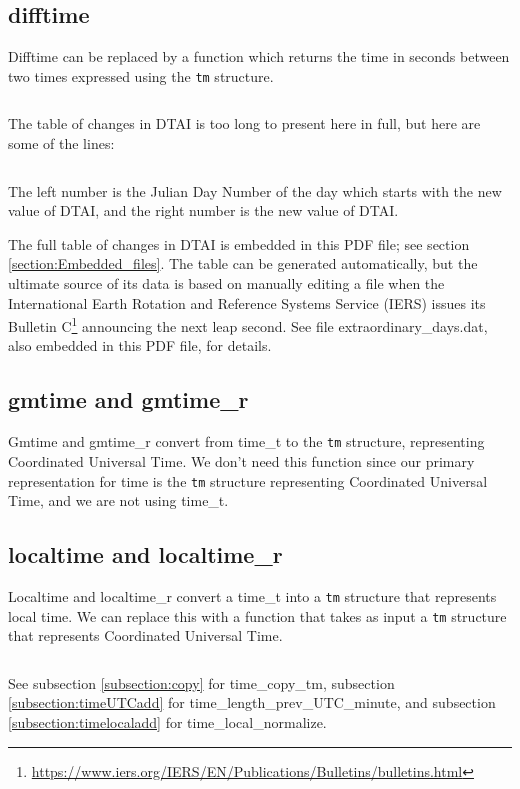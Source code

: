 \documentclass[letterpaper,twoside]{article}
\begin{document}
\subsection{difftime}
\label{subsection:difftime}
Difftime can be replaced by a function which returns the time in seconds
between two times expressed using the \verb|tm| structure.
\inputminted[firstline=37]{c}{time_diff.c}
The table of changes in DTAI is too long to present here in full,
but here are some of the lines:
\inputminted[firstline=46880,lastline=46906]{c}{dtai_table.tab}
The left number is the Julian Day Number of the day which starts with
the new value of DTAI, and the right number is the new value of DTAI.

The full table of changes in DTAI is embedded in this PDF file;
see section \ref{section:Embedded_files}.
The table can be generated automatically\citep{JBS_001}, but the ultimate
source of its data is based on manually editing a file when the
International Earth Rotation and Reference Systems Service (IERS)
issues its Bulletin C\footnote{\url{https://www.iers.org/IERS/EN/Publications/Bulletins/bulletins.html}} announcing the next leap second.  See file
{\ttfamily extraordinary\_days.dat}, also embedded in this PDF file,
for details.

\subsection{gmtime and gmtime\_r}
Gmtime and gmtime\_r convert from {\ttfamily time\_t} to
the \verb|tm| structure,
representing Coordinated Universal Time.  We don't
need this function since our primary representation for time is the
\verb|tm| structure representing Coordinated Universal Time,
and we are not using {\ttfamily time\_t}.

\subsection{localtime and localtime\_r}
\label{subsection:localtime}
Localtime and localtime\_r convert a {\ttfamily time\_t} into
a \verb|tm| structure that
represents local time.  We can replace this with a function that takes
as input a \verb|tm| structure that represents Coordinated Universal Time.
\inputminted[firstline=32]{c}{time_utc_to_local.c}
See subsection \ref{subsection:copy} for time\_copy\_tm,
subsection \ref{subsection:timeUTCadd} for
time\_\-length\_\-prev\_\-UTC\_\-minute,
and subsection \ref{subsection:timelocaladd} for time\_local\_normalize.
\end{document}
